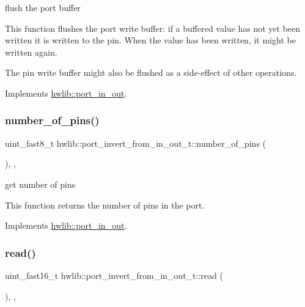 flush the port buffer

This function flushes the port write buffer\+: if a buffered value has not yet been written it is written to the pin. When the value has been written, it might be written again.

The pin write buffer might also be flushed as a side-\/effect of other operations. 

Implements \hyperlink{classhwlib_1_1port__in__out_a164564bcd08c137f0ff2e6445e9cfe5e}{hwlib\+::port\+\_\+in\+\_\+out}.

\mbox{\label{classhwlib_1_1port__invert__from__in__out__t_a150f95f7fe2520298a139cfd58293923}} 
\subsubsection{\texorpdfstring{number\+\_\+of\+\_\+pins()}{number\_of\_pins()}}
{\footnotesize\ttfamily uint\+\_\+fast8\+\_\+t hwlib\+::port\+\_\+invert\+\_\+from\+\_\+in\+\_\+out\+\_\+t\+::number\+\_\+of\+\_\+pins (\begin{DoxyParamCaption}{ }\end{DoxyParamCaption})\hspace{0.3cm}{\ttfamily [inline]}, {\ttfamily [override]}, {\ttfamily [virtual]}}

get number of pins

This function returns the number of pins in the port. 

Implements \hyperlink{classhwlib_1_1port__in__out_a44243a6c7664e734563f1809058751bc}{hwlib\+::port\+\_\+in\+\_\+out}.

\mbox{\label{classhwlib_1_1port__invert__from__in__out__t_afabad4a7b11e0127b82015b0efbb2e41}} 
\subsubsection{\texorpdfstring{read()}{read()}}
{\footnotesize\ttfamily uint\+\_\+fast16\+\_\+t hwlib\+::port\+\_\+invert\+\_\+from\+\_\+in\+\_\+out\+\_\+t\+::read (\begin{DoxyParamCaption}{ }\end{DoxyParamCaption})\hspace{0.3cm}{\ttfamily [inline]}, {\ttfamily [override]}, {\ttfamily [virtual]}}

